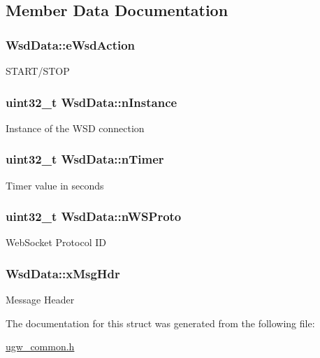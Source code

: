 \subsection{Member Data Documentation}
\hypertarget{structWsdData_aca064594dec04944d586de98018175e7}{
\subsubsection[{e\-Wsd\-Action}]{ Wsd\-Data\-::e\-Wsd\-Action}}\label{structWsdData_aca064594dec04944d586de98018175e7}
S\-T\-A\-R\-T/\-S\-T\-O\-P \hypertarget{structWsdData_a4050bfba1723b70da1250285635feec3}{
\subsubsection[{n\-Instance}]{\setlength{\rightskip}{0pt plus 5cm}uint32\-\_\-t Wsd\-Data\-::n\-Instance}}\label{structWsdData_a4050bfba1723b70da1250285635feec3}
Instance of the W\-S\-D connection \hypertarget{structWsdData_a9047f519a025fe4b44967b7728839e8e}{
\subsubsection[{n\-Timer}]{\setlength{\rightskip}{0pt plus 5cm}uint32\-\_\-t Wsd\-Data\-::n\-Timer}}\label{structWsdData_a9047f519a025fe4b44967b7728839e8e}
Timer value in seconds \hypertarget{structWsdData_a349311d9b1b3775f0a2e34fba656b8a9}{
\subsubsection[{n\-W\-S\-Proto}]{\setlength{\rightskip}{0pt plus 5cm}uint32\-\_\-t Wsd\-Data\-::n\-W\-S\-Proto}}\label{structWsdData_a349311d9b1b3775f0a2e34fba656b8a9}
Web\-Socket Protocol I\-D \hypertarget{structWsdData_a3232d4832bfa0ff6d0cf6d34aede399a}{
\subsubsection[{x\-Msg\-Hdr}]{ Wsd\-Data\-::x\-Msg\-Hdr}}\label{structWsdData_a3232d4832bfa0ff6d0cf6d34aede399a}
Message Header 

The documentation for this struct was generated from the following file\-:\begin{DoxyCompactItemize}
\item 
\hyperlink{ugw__common_8h}{ugw\-\_\-common.\-h}\end{DoxyCompactItemize}
